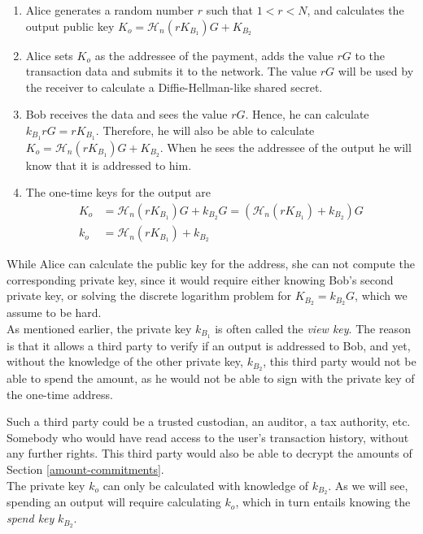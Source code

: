 \begin{enumerate}
	\item Alice generates a random number \(r\) such that \(1 < r < N\), and calculates the output public key \(K_{o} = \mathcal{H}_n (r K_{B_1} ) G + K_{B_2}\)

	\item Alice sets \(K_o\) as the addressee of the payment, adds the value \(r G\) to the transaction data and submits it to the network. The value \(r G\) will be used by the receiver to calculate a Diffie-Hellman-like shared secret.
	
	\item Bob receives the data and sees the value \(r G\). Hence, he can calculate \(k_{B_1} r G = r K_{B_1}\). Therefore, he will also be able to calculate \(K_{o} = \mathcal{H}_n(r K_{B_1}) G + K_{B_2}\). When he sees the addressee of the output he will know that it is addressed to him.
	
	\item The one-time keys for the output are
	\begin{align*}
		K_o &= \mathcal{H}_n (r K_{B_1}) G + k_{B_2} G = (\mathcal{H}_n (r K_{B_1}) + k_{B_2} ) G \\ 
		k_o &= \mathcal{H}_n (r K_{B_1}) + k_{B_2}
	\end{align*} 
\end{enumerate}

While Alice can calculate the public key for the address, she can not compute the corresponding private key, since it would require either knowing Bob's second private key, or solving the discrete logarithm problem for \(K_{B_2} = k_{B_2}G\), which we assume to be hard.
\\


As mentioned earlier, the private key \(k_{B_1}\) is often called the {\em view key}. The reason is that it allows a third
party to verify if an output is addressed to Bob, and yet, without the knowledge of the other
private key, \(k_{B_2}\), this third party would not be able to spend the amount, as he would not
be able to sign with the private key of the one-time address.

Such a third party could be a trusted custodian, an auditor, a tax authority, etc. Somebody who would
have read access to the user's transaction history, without any further rights.
This third party would also be able to decrypt the amounts of Section \ref{amount-commitments}.
\\


The private key \(k_o\) can only be calculated with knowledge of \(k_{B_2}\). As we will see,
spending an output will require calculating \(k_o\), which in turn entails knowing the {\em spend key}
\(k_{B_2}\).


